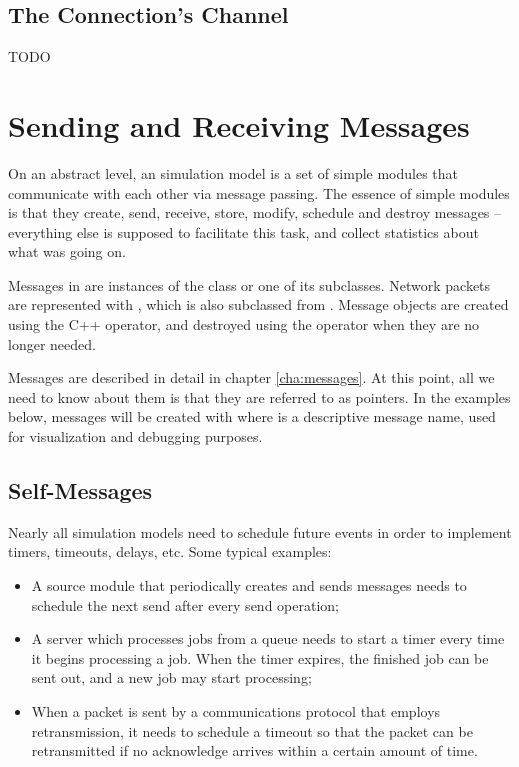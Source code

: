 \subsection{The Connection's Channel}

TODO


\section{Sending and Receiving Messages}
\label{sec:simple-modules:sending-and-receiving}

On an abstract level, an {\opp} simulation model is a set of
simple modules that communicate with each other via message passing.
The essence of simple modules is that they create, send, receive,
store, modify, schedule and destroy messages -- everything else
is supposed to facilitate this task, and collect statistics
about what was going on.

Messages in {\opp} are instances of the  class or one of
its subclasses. Network packets are represented with ,
which is also subclassed from . Message objects are
created using the C++  operator, and destroyed using the
 operator when they are no longer needed.

Messages are described in detail in chapter \ref{cha:messages}.
At this point, all we need to know about them is that they are
referred to as  pointers. In the examples below,
messages will be created with  where
 is a descriptive message name, used for visualization
and debugging purposes.


\subsection{Self-Messages}
\label{sec:ch-simple-modules:self-messages}

Nearly all simulation models need to schedule future events in order
to implement timers, timeouts, delays, etc. Some typical examples:

\begin{itemize}
  \item A source module that periodically creates and sends messages
    needs to schedule the next send after every send operation;
  \item A server which processes jobs from a queue needs to start
    a timer every time it begins processing a job. When the timer
    expires, the finished job can be sent out, and a new job may
    start processing;
  \item When a packet is sent by a communications protocol that employs
    retransmission, it needs to schedule a timeout so that the packet
    can be retransmitted if no acknowledge arrives within a certain
    amount of time.
\end{itemize}

